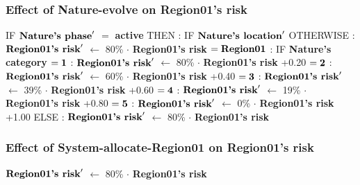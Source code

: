 \documentclass{article}%
\begin{document}
\subsubsection{Effect of Nature{-}evolve on Region01's risk}%
\label{ssubsec:Effect of Nature{-}evolve on Region01's risk}%
\begin{flushleft}%
IF %
$\mbox{\textbf{Nature's phase}} '$%
$=$%
\textbf{active}%
\linebreak%
\hspace*{2em}%
THEN %
: %
IF %
$\mbox{\textbf{Nature's location}} '$%
\linebreak%
\hspace*{4em}%
OTHERWISE %
: %
$\mbox{\textbf{Region01's risk}} '$%
$\leftarrow$%
80\%%
$\cdot$%
\textbf{Region01's risk}%
\linebreak%
\hspace*{4em}%
$= \mbox{\textbf{Region01}}$%
: %
IF %
\textbf{Nature's category}%
\linebreak%
\hspace*{6em}%
$= \mbox{\textbf{1}}$%
: %
$\mbox{\textbf{Region01's risk}} '$%
$\leftarrow$%
80\%%
$\cdot$%
\textbf{Region01's risk}%
+0.20%
\linebreak%
\hspace*{6em}%
$= \mbox{\textbf{2}}$%
: %
$\mbox{\textbf{Region01's risk}} '$%
$\leftarrow$%
60\%%
$\cdot$%
\textbf{Region01's risk}%
+0.40%
\linebreak%
\hspace*{6em}%
$= \mbox{\textbf{3}}$%
: %
$\mbox{\textbf{Region01's risk}} '$%
$\leftarrow$%
39\%%
$\cdot$%
\textbf{Region01's risk}%
+0.60%
\linebreak%
\hspace*{6em}%
$= \mbox{\textbf{4}}$%
: %
$\mbox{\textbf{Region01's risk}} '$%
$\leftarrow$%
19\%%
$\cdot$%
\textbf{Region01's risk}%
+0.80%
\linebreak%
\hspace*{6em}%
$= \mbox{\textbf{5}}$%
: %
$\mbox{\textbf{Region01's risk}} '$%
$\leftarrow$%
0\%%
$\cdot$%
\textbf{Region01's risk}%
+1.00%
\linebreak%
\hspace*{2em}%
ELSE %
: %
$\mbox{\textbf{Region01's risk}} '$%
$\leftarrow$%
80\%%
$\cdot$%
\textbf{Region01's risk}%
\end{flushleft}

%
\subsubsection{Effect of System{-}allocate{-}Region01 on Region01's risk}%
\label{ssubsec:Effect of System{-}allocate{-}Region01 on Region01's risk}%
\begin{flushleft}%
$\mbox{\textbf{Region01's risk}} '$%
$\leftarrow$%
80\%%
$\cdot$%
\textbf{Region01's risk}%
\end{flushleft}
\end{document}
